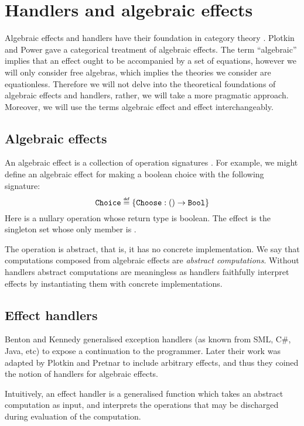 \section{Handlers and algebraic effects}\label{sec:handlers-and-effects}
Algebraic effects and handlers have their foundation in category theory \cite{Plotkin2001a,Plotkin2013}. Plotkin and Power \cite{Plotkin2001b,Plotkin2001a} gave a categorical treatment of algebraic effects. The term ``algebraic'' implies that an effect ought to be accompanied by a set of equations, however we will only consider free algebras, which implies the theories we consider are equationless. Therefore we will not delve into the theoretical foundations of algebraic effects and handlers, rather, we will take a more pragmatic approach. Moreover, we will use the terms algebraic effect and effect interchangeably.

\subsection{Algebraic effects}
An algebraic effect is a collection of operation signatures \cite{Lindley2014}. For example, we might define an algebraic effect  for making a boolean choice with the following signature:
\[ \type{Choice} \defas \{ \type{Choose}: () \to \type{Bool} \} \]
Here  is a nullary operation whose return type is boolean. The effect  is the singleton set whose only member is . 

The operation  is abstract, that is, it has no concrete implementation. We say that computations composed from algebraic effects are \emph{abstract computations}. Without handlers abstract computations are meaningless as handlers faithfully interpret effects by instantiating them with concrete implementations. 

\subsection{Effect handlers}
Benton and Kennedy generalised exception handlers \cite{Benton2001} (as known from SML, C\#, Java, etc) to expose a continuation to the programmer. Later their work was adapted by Plotkin and Pretnar \cite{Plotkin2013} to include arbitrary effects, and thus they coined the notion of handlers for algebraic effects.

Intuitively, an effect handler is a generalised function which takes an abstract computation as input, and interprets the operations that may be discharged during evaluation of the computation. 

